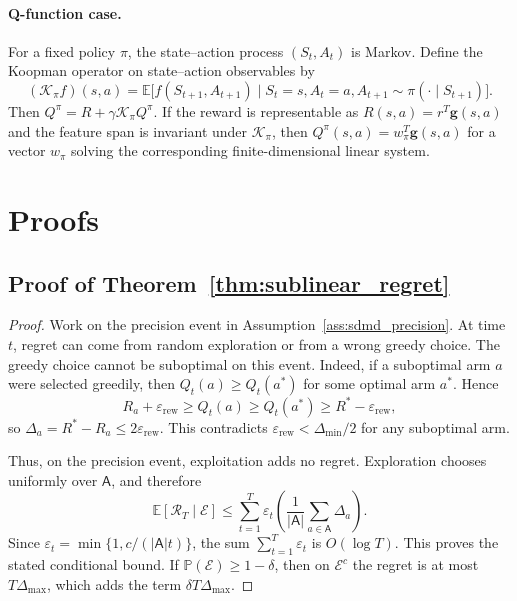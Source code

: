 \documentclass{article}
\numberwithin{equation}{section}
\theoremstyle{definition}
\begin{document}
\paragraph{Q-function case.}
For a fixed policy $\pi$, the state--action process $(S_t,A_t)$ is Markov. Define the Koopman operator on state--action observables by
\[
(\mathcal{K}_\pi f)(s,a)
=\mathbb{E}\bigl[f(S_{t+1},A_{t+1})\mid S_t=s,A_t=a,
A_{t+1}\sim\pi(\cdot\mid S_{t+1})\bigr].
\]
Then $Q^\pi=R+\gamma\mathcal{K}_\pi Q^\pi$. If the reward is representable as $R(s,a)=r^T\mathbf g(s,a)$ and the feature span is invariant under $\mathcal{K}_\pi$, then $Q^\pi(s,a)=w_\pi^T\mathbf g(s,a)$ for a vector $w_\pi$ solving the corresponding finite-dimensional linear system.

\section{Proofs}

\subsection{Proof of Theorem~\ref{thm:sublinear_regret}}\label{thmpf:sublinear_regret}
\begin{proof}
Work on the precision event in Assumption~\ref{ass:sdmd_precision}. At time $t$, regret can come from random exploration or from a wrong greedy choice. The greedy choice cannot be suboptimal on this event. Indeed, if a suboptimal arm $a$ were selected greedily, then $Q_t(a)\ge Q_t(a^*)$ for some optimal arm $a^*$. Hence
\[
R_a+\varepsilon_{\mathrm{rew}}
\ge Q_t(a)
\ge Q_t(a^*)
\ge R^*-\varepsilon_{\mathrm{rew}},
\]
so $\Delta_a=R^*-R_a\le2\varepsilon_{\mathrm{rew}}$. This contradicts $\varepsilon_{\mathrm{rew}}<\Delta_{\min}/2$ for any suboptimal arm.

Thus, on the precision event, exploitation adds no regret. Exploration chooses uniformly over $\mathsf{A}$, and therefore
\[
\mathbb{E}[\mathcal{R}_T\mid \mathcal{E}]
\le
\sum_{t=1}^T\varepsilon_t
\left(\frac{1}{|\mathsf{A}|}\sum_{a\in\mathsf{A}}\Delta_a\right).
\]
Since $\varepsilon_t=\min\{1,c/(|\mathsf{A}|t)\}$, the sum $\sum_{t=1}^T\varepsilon_t$ is $O(\log T)$. This proves the stated conditional bound. If $\mathbb{P}(\mathcal{E})\ge1-\delta$, then on $\mathcal{E}^c$ the regret is at most $T\Delta_{\max}$, which adds the term $\delta T\Delta_{\max}$.
\end{proof}
\end{document}
